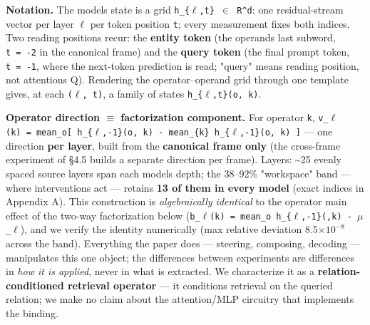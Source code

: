 \textbf{Notation.} The model\textquotesingle s state is a grid
\texttt{h\_\{\ensuremath{\ell},t\}\ \ensuremath{\in}\ R\^{}d}: one residual-stream vector per layer
\texttt{\ensuremath{\ell}} per token position \texttt{t}; every measurement fixes both
indices. Two reading positions recur: the \textbf{entity token} (the
operand\textquotesingle s last subword, \texttt{t\ =\ -2} in the
canonical frame) and the \textbf{query token} (the final prompt token,
\texttt{t\ =\ -1}, where the next-token prediction is read; "query"
means reading position, not attention\textquotesingle s Q). Rendering
the operator--operand grid through one template gives, at each
\texttt{(\ensuremath{\ell},\ t)}, a family of states \texttt{h\_\{\ensuremath{\ell},t\}(o,\ k)}.

\textbf{Operator direction \ensuremath{\equiv} factorization component.} For operator
\texttt{k},
\texttt{v\_\ensuremath{\ell}(k)\ =\ mean\_o{[}\ h\_\{\ensuremath{\ell},-1\}(o,\ k)\ -\ mean\_\{k\textquotesingle{}\}\ h\_\{\ensuremath{\ell},-1\}(o,\ k\textquotesingle{})\ {]}}
--- one direction \textbf{per layer}, built from the \textbf{canonical
frame only} (the cross-frame experiment of \S{}4.5 builds a separate
direction per frame). Layers: \textasciitilde25 evenly spaced source
layers span each model\textquotesingle s depth; the 38--92\% "workspace"
band --- where interventions act --- retains \textbf{13 of them in every
model} (exact indices in Appendix A). This construction is
\emph{algebraically identical} to the operator main effect of the
two-way factorization below
(\texttt{b\_\ensuremath{\ell}(k)\ =\ mean\_o\ h\_\{\ensuremath{\ell},-1\}(\textperiodcentered{},k)\ -\ \ensuremath{\mu}\_\ensuremath{\ell}}), and we verify
the identity numerically (max relative deviation 8.5\ensuremath{\times}\ensuremath{10^{-8}} across the
band). Everything the paper does --- steering, composing, decoding ---
manipulates this one object; the differences between experiments are
differences in \emph{how it is applied}, never in what is extracted. We
characterize it as a \textbf{relation-conditioned retrieval operator}
--- it conditions retrieval on the queried relation; we make no claim
about the attention/MLP circuitry that implements the binding.

